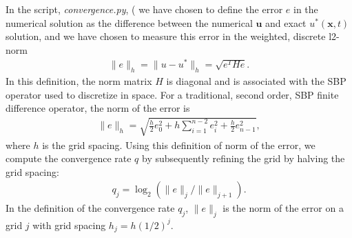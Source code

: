 \documentclass[a4paper]{article}
\newcommand{\ub}{\mathbf{u}}
\newcommand{\xb}{\mathbf{x}}
\begin{document}
In the script, \emph{convergence.py}, (%
we have chosen
to define the error $e$ in the numerical solution as the difference between the
numerical $\ub$ and exact $u^*(\xb,t)$ solution, and we have chosen to measure
this error in the weighted, discrete l2-norm
\begin{align}
        \|e\|_h = \| u - u^* \|_h = \sqrt{e^T H e}.
        \label{error}
\end{align}
In this definition, the norm matrix $H$ is diagonal and is associated with the
SBP operator used to discretize in space. For a traditional, second order, SBP
finite difference operator, the norm of the error is
\begin{align}
        \|e\|_h = \sqrt{\frac{h}{2}e_0^2
        +  h\sum_{i=1}^{n-2}e_i^2  + \frac{h}{2}e_{n-1}^2},
\nonumber
\end{align}
where $h$ is the grid spacing.
Using this definition of norm of the error, we compute the convergence rate $q$
by subsequently refining the grid by halving the grid spacing:
\begin{align}
q_j = \log_2( \|e\|_{j}/\|e\|_{j+1} ).
\nonumber
\end{align}
In the definition of the convergence rate $q_j$,  $\|e\|_j$ is the norm of the
error on a grid $j$ with grid spacing $h_j = h (1/2)^j$.
\end{document}
